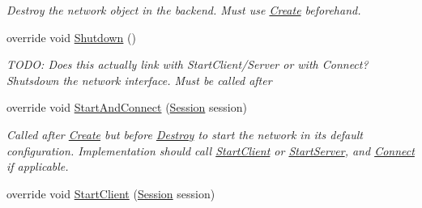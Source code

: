 \begin{DoxyCompactItemize}
\begin{DoxyCompactList}\small\item\em Destroy the network object in the backend. Must use \hyperlink{class_skyrates_1_1_common_1_1_network_1_1_network_common_a575172eb9f965e181e19649bcce38ca0}{Create} beforehand.  \end{DoxyCompactList}\item 
\hypertarget{class_skyrates_1_1_client_1_1_network_1_1_dummy_client_a6e2df63c9102493cacdd16c183f55916}{override void \hyperlink{class_skyrates_1_1_client_1_1_network_1_1_dummy_client_a6e2df63c9102493cacdd16c183f55916}{Shutdown} ()}\label{class_skyrates_1_1_client_1_1_network_1_1_dummy_client_a6e2df63c9102493cacdd16c183f55916}

\begin{DoxyCompactList}\small\item\em T\-O\-D\-O\-: Does this actually link with Start\-Client/\-Server or with Connect? Shutsdown the network interface. Must be called after  \end{DoxyCompactList}\item 
\hypertarget{class_skyrates_1_1_client_1_1_network_1_1_dummy_client_a2033357a7e9e093baa015bdc234be0a3}{override void \hyperlink{class_skyrates_1_1_client_1_1_network_1_1_dummy_client_a2033357a7e9e093baa015bdc234be0a3}{Start\-And\-Connect} (\hyperlink{class_skyrates_1_1_common_1_1_network_1_1_session}{Session} session)}\label{class_skyrates_1_1_client_1_1_network_1_1_dummy_client_a2033357a7e9e093baa015bdc234be0a3}

\begin{DoxyCompactList}\small\item\em Called after \hyperlink{class_skyrates_1_1_common_1_1_network_1_1_network_common_a575172eb9f965e181e19649bcce38ca0}{Create} but before \hyperlink{class_skyrates_1_1_common_1_1_network_1_1_network_common_aa00266a16aa27dfd0eb242c74856a92a}{Destroy} to start the network in its default configuration. Implementation should call \hyperlink{class_skyrates_1_1_common_1_1_network_1_1_network_common_a982b732d621ff3f8738319053af8d154}{Start\-Client} or \hyperlink{class_skyrates_1_1_common_1_1_network_1_1_network_common_ac1209cf3fc31d2f145678971472ec20c}{Start\-Server}, and \hyperlink{class_skyrates_1_1_common_1_1_network_1_1_network_common_aa11961a4a6dc22c782552eb96e27c6e1}{Connect} if applicable.  \end{DoxyCompactList}\item 
\hypertarget{class_skyrates_1_1_client_1_1_network_1_1_dummy_client_a9d69f75af0008f2ae3da1f040814add4}{override void \hyperlink{class_skyrates_1_1_client_1_1_network_1_1_dummy_client_a9d69f75af0008f2ae3da1f040814add4}{Start\-Client} (\hyperlink{class_skyrates_1_1_common_1_1_network_1_1_session}{Session} session)}\label{class_skyrates_1_1_client_1_1_network_1_1_dummy_client_a9d69f75af0008f2ae3da1f040814add4}


\end{DoxyCompactItemize}
